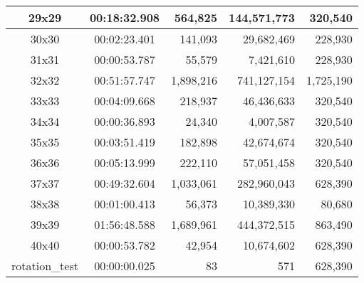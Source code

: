 \begin{center}
\begin{tabular}{|c|c|r|r|r|}
		29x29 & 00:18:32.908 & 564,825 & 144,571,773 & 320,540 \\ \hline
		30x30 & 00:02:23.401 & 141,093 & 29,682,469 & 228,930 \\ \hline
		31x31 & 00:00:53.787 & 55,579 & 7,421,610 & 228,930 \\ \hline
		32x32 & 00:51:57.747 & 1,898,216 & 741,127,154 & 1,725,190 \\ \hline
		33x33 & 00:04:09.668 & 218,937 & 46,436,633 & 320,540 \\ \hline
		34x34 & 00:00:36.893 & 24,340 & 4,007,587 & 320,540 \\ \hline
		35x35 & 00:03:51.419 & 182,898 & 42,674,674 & 320,540 \\ \hline
		36x36 & 00:05:13.999 & 222,110 & 57,051,458 & 320,540 \\ \hline
		37x37 & 00:49:32.604 & 1,033,061 & 282,960,043 & 628,390 \\ \hline
		38x38 & 00:01:00.413 & 56,373 & 10,389,330 & 80,680 \\ \hline
		39x39 & 01:56:48.588 & 1,689,961 & 444,372,515 & 863,490 \\ \hline
		40x40 & 00:00:53.782 & 42,954 & 10,674,602 & 628,390 \\ \hline
		rotation\_test & 00:00:00.025 & 83 & 571 & 628,390 \\ \hline

    \end{tabular}
\end{center}
